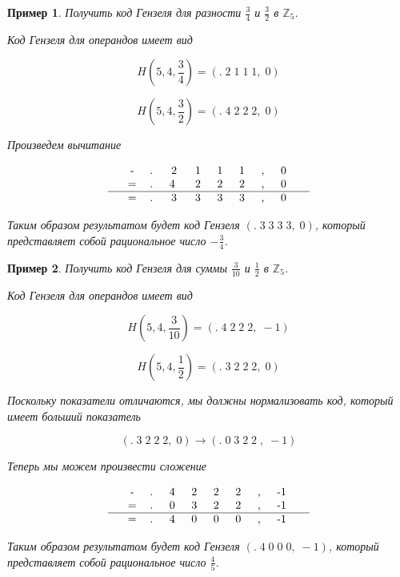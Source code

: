 \documentclass[master, och, diploma, times]{sty/SCWorks}
\theoremstyle{plain}
\newtheorem{exmp}{Пример}[section]
\theoremstyle{definition}
\begin{document}
\begin{exmp}
Получить код Гензеля для разности $\frac{3}{4}$ и $\frac{3}{2}$ в $\mathbb{Z}_5$.

\noindent Код Гензеля для операндов имеет вид

$$H(5,4, \frac{3}{4})=(.\; 2\; 1\; 1\; 1,\; 0)$$

$$H(5,4, \frac{3}{2})=(.\; 4\; 2\; 2\; 2,\; 0)$$


\noindent Произведем вычитание

$$
\begin{tabular}{ccccccccccc}
& - & .\; & 2\; & 1\; & 1\; & 1\; & ,\; & 0\; &  \\
& = & .\; & 4 \; & 2\; & 2\; & 2\; & ,\; & 0\; &  \\
\hline
& = & .\; & 3\; & 3\; & 3\; & 3\; & ,\; & 0\; &
\end{tabular}
$$


\noindent Таким образом результатом будет код Гензеля $(.\; 3\; 3\; 3\; 3,\; 0)$, который представляет собой рациональное число $-\frac{3}{4}$.
\end{exmp}


\begin{exmp}
Получить код Гензеля для суммы $\frac{3}{10}$ и $\frac{1}{2}$ в $\mathbb{Z}_5$.

\noindent Код Гензеля для операндов имеет вид

$$H(5,4, \frac{3}{10})=(.\; 4\; 2\; 2\; 2,\; -1)$$

$$H(5,4, \frac{1}{2})=(.\; 3\; 2\; 2\; 2,\; 0)$$


\noindent Поскольку показатели отличаются, мы должны нормализовать код, который имеет больший показатель

$$ 
(.\; 3\; 2\; 2\; 2,\; 0) \rightarrow (.\; 0 \; 3\; 2\; 2\; ,\; -1)
$$

\noindent Теперь мы можем произвести сложение

$$
\begin{tabular}{ccccccccccc}
& - & .\; & 4\; & 2\; & 2\; & 2\; & ,\; & -1\; &  \\
& = & .\; & 0\; & 3\; & 2\; & 2\; & ,\; & -1\; &  \\
\hline
& = & .\; & 4\; & 0\; & 0\; & 0\; & ,\; & -1\; &
\end{tabular}
$$


\noindent Таким образом результатом будет код Гензеля $(.\; 4\; 0\; 0\; 0,\; -1)$, который представляет собой рациональное число $\frac{4}{5}$.
\end{exmp}
\end{document}
